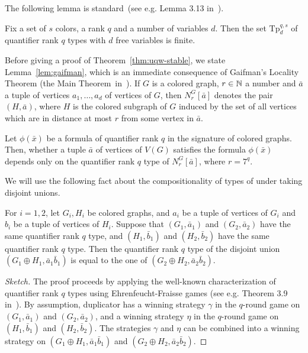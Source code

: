 The following lemma is standard~(see e.g. Lemma 3.13 in~\cite{libkin}).
\begin{lemma}\label{lem:q-types}
	Fix a set of $s$ colors, a rank $q$ and a number of variables $d$.
	Then the set $\mathrm{Tp}^{q,s}_d$ of quantifier rank $q$ types with $d$ free variables is finite.
\end{lemma}


Before giving a proof of Theorem~\ref{thm:uqw-stable},
we state Lemma~\ref{lem:gaifman}, which is an
immediate consequence of Gaifman's Locality Theorem
(the Main Theorem~in~\cite{gaifman1982local}).
 If $G$ is a colored graph, $r\in\mathbb{N}$  a number and $\bar a$ a tuple of vertices $a_1,\ldots,a_d$  of vertices of $G$, then  $N^G_r[\bar a]$ denotes the pair $(H,\bar a)$, where $H$ is the colored subgraph of $G$
induced by the set of all vertices which are in distance at most $r$
from some vertex in $\bar a$.

\begin{lemma}\label{lem:gaifman}
	Let $\phi(\bar x)$ be a  formula 
	of quantifier rank $q$
	in the signature of colored graphs. 	Then, whether a tuple $\bar a$ of vertices of $V(G)$
	satisfies the formula $\phi(\bar x)$
	depends only on the quantifier rank $q$ type of  $N^G_r[\bar a]$,
 where $r=7^q$.
\end{lemma}

We will use the following fact about the compositionality of types of 
under taking disjoint unions.
		\begin{lemma}\label{lem:type-union}
			For $i=1,2$, let $G_i,H_i$ be colored graphs,
			and $a_i$ be a tuple of vertices of $G_i$
			and $b_i$ be a tuple of vertices of $H_i$.
			Suppose that $(G_1,\bar a_1)$ and $(G_2,\bar a_2)$ 
			have the same quantifier rank $q$ type,
			and $(H_1,\bar b_1)$ and $(H_2,\bar b_2)$ 
			have the same quantifier rank $q$ type.			
			Then the quantifier rank $q$ type of the disjoint union 
			$(G_1\oplus H_1,\bar a_1\bar b_1)$ is equal to the one of $(G_2\oplus H_2,\bar a_2\bar b_2)$. \end{lemma}
\begin{proof}[Sketch]
	The proof proceeds by applying the well-known characterization 
	of quantifier rank $q$  types using Ehrenfeucht-Fraisse games (see e.g. Theorem 3.9 in~\cite{libkin}). By assumption, duplicator has a winning strategy $\gamma$ in the $q$-round game on $(G_1,\bar a_1)$ and $(G_2,\bar a_2)$, and a winning strategy $\eta$ in the $q$-round game on $(H_1,\bar b_1)$ and $(H_2,\bar b_2)$. The strategies $\gamma$ and $\eta$ can be combined into a winning strategy on $(G_1\oplus H_1,\bar a_1\bar b_1)$ and $(G_2\oplus H_2,\bar a_2\bar b_2)$.
\end{proof}


